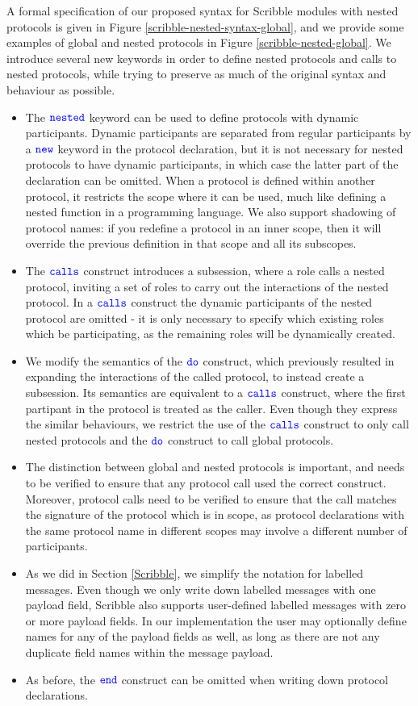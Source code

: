 \documentclass[12pt,twoside]{report}
\begin{document}
A formal specification of our proposed syntax for Scribble modules with nested protocols is given in Figure \ref{scribble-nested-syntax-global}, and we provide some examples of global and nested protocols in Figure \ref{scribble-nested-global}. We introduce several new keywords in order to define nested protocols and calls to nested protocols, while trying to preserve as much of the original syntax and behaviour as possible.
\begin{itemize}
    \item The ${\color{blue}\mathtt{nested}}$ keyword can be used to define protocols with dynamic participants. Dynamic participants are separated from regular participants by a ${\color{blue}\mathtt{new}}$ keyword in the protocol declaration, but it is not necessary for nested protocols to have dynamic participants, in which case the latter part of the declaration can be omitted. When a protocol is defined within another protocol, it restricts the scope where it can be used, much like defining a nested function in a programming language. We also support shadowing of protocol names: if you redefine a protocol in an inner scope, then it will override the previous definition in that scope and all its subscopes.
    \item The ${\color{blue}\mathtt{calls}}$ construct introduces a subsession, where a role calls a nested protocol, inviting a set of roles to carry out the interactions of the nested protocol. In a ${\color{blue}\mathtt{calls}}$ construct the dynamic participants of the nested protocol are omitted - it is only necessary to specify which existing roles which be participating, as the remaining roles will be dynamically created.
    \item We modify the semantics of the ${\color{blue}\mathtt{do}}$ construct, which previously resulted in expanding the interactions of the called protocol, to instead create a subsession. Its semantics are equivalent to a ${\color{blue}\mathtt{calls}}$ construct, where the first partipant in the protocol is treated as the caller. Even though they express the similar behaviours, we restrict the use of the ${\color{blue}\mathtt{calls}}$ construct to only call nested protocols and the ${\color{blue}\mathtt{do}}$ construct to call global protocols. 
    \item The distinction between global and nested protocols is important, and needs to be verified to ensure that any protocol call used the correct construct. Moreover, protocol calls need to be verified to ensure that the call matches the signature of the protocol which is in scope, as protocol declarations with the same protocol name in different scopes may involve a different number of participants.
    \item As we did in Section \ref{Scribble}, we simplify the notation for labelled messages. Even though we only write down labelled messages with one payload field, Scribble also supports user-defined labelled messages with zero or more payload fields. In our implementation the user may optionally define names for any of the payload fields as well, as long as there are not any duplicate field names within the message payload.
    \item As before, the ${\color{blue}\mathtt{end}}$ construct can be omitted when writing down protocol declarations.
\end{itemize}
\end{document}
